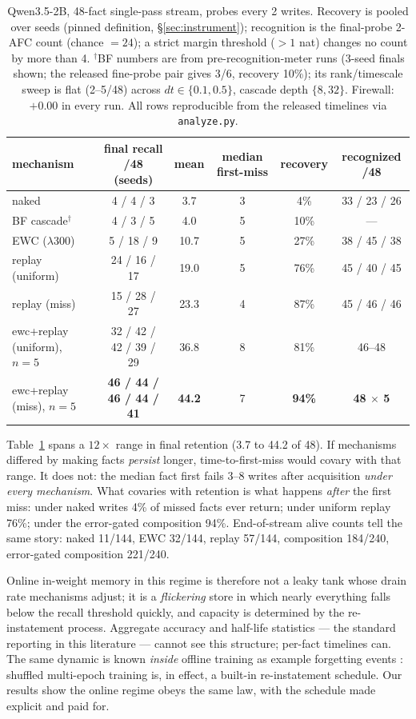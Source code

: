 \documentclass[11pt]{article}
\newcommand{\qwen}{Qwen3.5-2B}
\begin{document}
\begin{table}[t]
\centering\small
\begin{tabular}{lccccc}
\toprule
mechanism & final recall /48 (seeds) & mean & median first-miss & recovery & recognized /48 \\
\midrule
naked            & 4 / 4 / 3    & 3.7  & 3   & 4\%  & 33 / 23 / 26 \\
BF cascade$^\dagger$ & 4 / 3 / 5 & 4.0 & 5   & 10\% & --- \\
EWC ($\lambda$300) & 5 / 18 / 9 & 10.7 & 5   & 27\% & 38 / 45 / 38 \\
replay (uniform) & 24 / 16 / 17 & 19.0 & 5   & 76\% & 45 / 40 / 45 \\
replay (miss)    & 15 / 28 / 27 & 23.3 & 4   & 87\% & 45 / 46 / 46 \\
ewc+replay (uniform), $n{=}5$ & 32 / 42 / 42 / 39 / 29 & 36.8 & 8 & 81\% & 46--48 \\
ewc+replay (miss), $n{=}5$ & \textbf{46 / 44 / 46 / 44 / 41} & \textbf{44.2} & 7 & \textbf{94\%} & \textbf{48 $\times$ 5} \\
\bottomrule
\end{tabular}
\caption{\qwen{}, 48-fact single-pass stream, probes every 2 writes. Recovery is pooled over seeds
(pinned definition, \S\ref{sec:instrument}); recognition is the final-probe 2-AFC count (chance
$=24$); a strict margin threshold ($>1$ nat) changes no count by more than 4. $^\dagger$BF numbers
are from pre-recognition-meter runs (3-seed finals shown; the released fine-probe pair gives 3/6,
recovery 10\%); its rank/timescale sweep is flat (2--5/48) across $dt\in\{0.1,0.5\}$, cascade depth
$\{8,32\}$. Firewall: $+0.00$ in every run. All rows reproducible from the released timelines via
\texttt{analyze.py}.}
\label{tab:main}
\end{table}

Table~\ref{tab:main} spans a $12\times$ range in final retention (3.7 to 44.2 of 48). If mechanisms
differed by making facts \emph{persist} longer, time-to-first-miss would covary with that range. It
does not: the median fact first fails 3--8 writes after acquisition \emph{under every mechanism}. What
covaries with retention is what happens \emph{after} the first miss: under naked writes 4\% of missed
facts ever return; under uniform replay 76\%; under the error-gated composition 94\%. End-of-stream
alive counts tell the same story: naked 11/144, EWC 32/144, replay 57/144, composition 184/240,
error-gated composition 221/240.

Online in-weight memory in this regime is therefore not a leaky tank whose drain rate mechanisms
adjust; it is a \emph{flickering} store in which nearly everything falls below the recall threshold
quickly, and capacity is determined by the re-instatement process. Aggregate accuracy and half-life
statistics --- the standard reporting in this literature --- cannot see this structure; per-fact
timelines can. The same dynamic is known \emph{inside} offline training as example forgetting events
\citep{toneva2019}: shuffled multi-epoch training is, in effect, a built-in re-instatement schedule.
Our results show the online regime obeys the same law, with the schedule made explicit and paid for.
\end{document}
